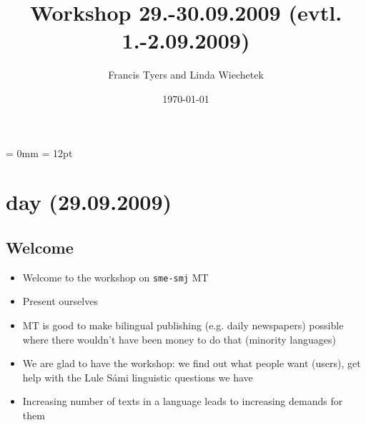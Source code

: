 \documentclass[a4paper,english,12pt]{article}
\begin{document}
\setcounter{secnumdepth}{3}
\setcounter{tocdepth}{3}
\begin{spacing}{1.0}
\end{spacing}

\newcommand{\tx}{\mbox{t\hspace{-.35em}-}} %

\title{{\Large Workshop 29.-30.09.2009 (evtl. 1.-2.09.2009)}}

\author{Francis Tyers and Linda Wiechetek}
\date{\today}
\maketitle


\thispagestyle{empty}
\tableofcontents 
\thispagestyle{empty} %

\newpage

\setcounter{page}{1} %

\parindent = 0mm
\parskip = 12pt


\section{day (29.09.2009)}
\subsection{Welcome}
\begin{itemize}
\item Welcome to the workshop on {\tt sme-smj} MT
\item Present ourselves
\item MT is good to make bilingual publishing (e.g. daily newspapers) possible where there wouldn't have been money to do that (minority languages)
\item We are glad to have the workshop: we find out what people want (users), get help with the Lule Sámi linguistic questions we have
\item Increasing number of texts in a language leads to increasing demands for them
\end{itemize}
\end{document}

